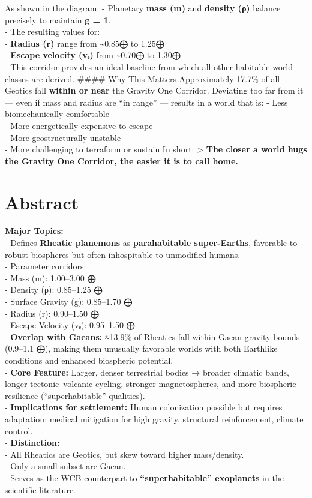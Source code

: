 \documentclass[
  letterpaper,
]{book}
\begin{document}
As shown in the diagram: - Planetary \textbf{mass (m)} and
\textbf{density (ρ)} balance precisely to maintain \textbf{g = 1}.\\
- The resulting values for:\\
- \textbf{Radius (r)} range from \textasciitilde0.85⨁ to 1.25⨁\\
- \textbf{Escape velocity (vₑ)} from \textasciitilde0.70⨁ to 1.30⨁\\
- This corridor provides an ideal baseline from which all other
habitable world classes are derived. \#\#\#\# Why This Matters
Approximately 17.7\% of all Geotics fall \textbf{within or near} the
Gravity One Corridor. Deviating too far from it --- even if mass and
radius are ``in range'' --- results in a world that is: - Less
biomechanically comfortable\\
- More energetically expensive to escape\\
- More geostructurally unstable\\
- More challenging to terraform or sustain In short: \textgreater{}
\textbf{The closer a world hugs the Gravity One Corridor, the easier it
is to call home.}

\section{Abstract}\label{abstract-19}

\textbf{Major Topics:}\\
- Defines \textbf{Rheatic planemons} as \textbf{parahabitable
super-Earths}, favorable to robust biospheres but often inhospitable to
unmodified humans.\\
- Parameter corridors:\\
- Mass (m): 1.00--3.00 ⨁\\
- Density (ρ): 0.85--1.25 ⨁\\
- Surface Gravity (g): 0.85--1.70 ⨁\\
- Radius (r): 0.90--1.50 ⨁\\
- Escape Velocity (vₑ): 0.95--1.50 ⨁\\
- \textbf{Overlap with Gaeans:} ≈13.9\% of Rheatics fall within Gaean
gravity bounds (0.9--1.1 ⨁), making them unusually favorable worlds with
both Earthlike conditions and enhanced biospheric potential.\\
- \textbf{Core Feature:} Larger, denser terrestrial bodies → broader
climatic bands, longer tectonic--volcanic cycling, stronger
magnetospheres, and more biospheric resilience (``superhabitable''
qualities).\\
- \textbf{Implications for settlement:} Human colonization possible but
requires adaptation: medical mitigation for high gravity, structural
reinforcement, climate control.\\
- \textbf{Distinction:}\\
- All Rheatics are Geotics, but skew toward higher mass/density.\\
- Only a small subset are Gaean.\\
- Serves as the WCB counterpart to \textbf{``superhabitable''
exoplanets} in the scientific literature.
\end{document}
